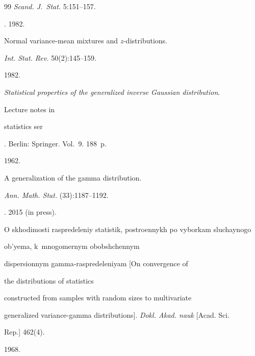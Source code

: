 {{\begin{thebibliography}{99}
\textit{Scand. J.~Stat.} 5:151--157.







. 1982.


Normal variance-mean mixtures and $z$-distributions.


\textit{Int. Stat. Rev.} 50(2):145--159.







 1982.


\textit{Statistical properties of the generalized inverse Gaussian distribution}.


{Lecture notes in


statistics ser}.  Berlin: Springer. Vol.~9.  188~p.







 1962.


A generalization of the gamma distribution.


\textit{Ann. Math. Stat.} (33):1187--1192.







. 2015 (in press).


O skhodimosti raspredeleniy statistik, postroennykh po vyborkam sluchaynogo


ob'yema, k~mnogomernym obobshchennym


dispersionnym gamma-raspredeleniyam [On convergence of


the distributions of statistics


constructed from samples with random sizes to multivariate


generalized variance-gamma distributions]. \textit{Dokl. Akad. nauk} [Acad. Sci.


Rep.] 462(4).







 1968.



\end{thebibliography}}}
